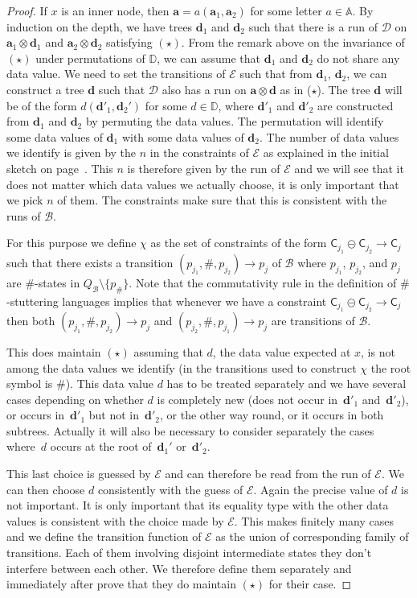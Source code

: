 \documentclass{CSML}
\newcommand\A{\ensuremath{\mathbb{A}}\xspace}
\newcommand\D{\mathbb{D}}
\newcommand\Ba{\mathcal{B}}
\newcommand\Da{\mathcal{D}}
\newcommand\Ea{\mathcal{E}}
\newcommand\merc[3]{\mathsf{C}_{#1}\mathpunct{\circleddash}\mathsf{C}_{#2}\to\mathsf{C}_{#3}}
\newcommand\atree{\boldsymbol{a}}
\newcommand\dtree{\boldsymbol{d}}
\begin{document}
\begin{proof}
If $x$ is an inner node, then $\atree=a(\atree_1,\atree_2)$ for some letter
$a\in \A$.  By induction on the depth, we have trees $\dtree_1$
and $\dtree_2$ such that there is a run of $\Da$ on $\atree_1\otimes\dtree_1$ and $\atree_2\otimes\dtree_2$ satisfying $(\star)$. 
From the remark above on the invariance of $(\star)$ under permutations of $\D$, 
we can assume that $\dtree_1$ and $\dtree_2$
do not share any data value.
We need to set the transitions of $\Ea$ such that from $\dtree_1$, $\dtree_2$,
we can construct a tree $\dtree$ such that $\Da$ also has 
a run on $\atree\otimes\dtree$ as in ($\star$). The tree $\dtree$ will
be of the form $d(\dtree'_1,\dtree_2')$ for some $d\in \D$, where $\dtree'_1$
and $\dtree'_2$ are constructed from $\dtree_1$ and $\dtree_2$ by permuting
the data values. The permutation will identify some data values of $\dtree_1$
with some data values of $\dtree_2$. The number of data values we identify is
given by the $n$ in the constraints of $\Ea$ as explained in the initial
sketch on page~\pageref{sketch:sec-dad-counter}. 
This $n$ is therefore given by the run of $\Ea$ and we will see that it does not
matter which data values we actually choose, it is only important that we pick
$n$ of them. The constraints make sure that this is consistent with the runs of $\Ba$.

For this purpose we define $\chi$ as the set of constraints of the form
$\merc{j_1}{j_2}{j}$ such that there exists a transition $(p_{j_1},\#, p_{j_2})
\to p_j$ of $\Ba$ where $p_{j_1}$, $p_{j_2}$, and $p_j$ are $\#$-states in
$Q_\Ba \setminus \{ p_\#\}$.  Note that the commutativity rule in the
definition of $\#$-stuttering languages implies that whenever we have a
constraint $\merc{j_1}{j_2}{j}$ then both $(p_{j_1},\#, p_{j_2}) \to p_j$ and
$(p_{j_2},\#, p_{j_1}) \to p_j$ are transitions of $\Ba$.

This does maintain $(\star)$ assuming that $d$, the data value expected at $x$,
is not among the data values we identify (in the transitions used to construct
$\chi$ the root symbol is $\#$). This data value $d$ has to be treated
separately and we have several cases depending on whether $d$ is completely new
(does not occur in~$\dtree'_1$ and~$\dtree'_2$), or occurs in~$\dtree'_1$ but
not in~$\dtree'_2$, or the other way round, or it occurs in both subtrees. Actually it
will also be necessary to consider separately the cases where~$d$ occurs at the
root of~$\dtree_1'$ or~$\dtree'_2$.

This last choice is guessed by $\Ea$ and can therefore be read from the run
of $\Ea$. We can then choose $d$ consistently with the guess of $\Ea$. Again
the precise value of $d$ is not important. It is only important that its
equality type with the other data values is consistent with the choice made by
$\Ea$. This makes finitely many cases and we define the transition function of
$\Ea$ as the union of corresponding family of transitions. Each of them
involving disjoint intermediate states they don't interfere between each
other. We therefore define them separately and immediately after prove that they
do maintain $(\star)$ for their case.


\end{proof}
\end{document}
